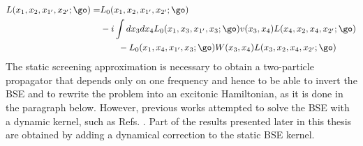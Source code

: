 \begin{align}
\begin{split}
	L(x_1,x_2,x_{1'},x_{2'};\go) = &L_0(x_1,x_2,x_{1'},x_{2'};\go) \\
	    &-i \int dx_3dx_4 L_0(x_1,x_3,x_{1'},x_{3};\go) v(x_3,x_4) L(x_4,x_2,x_{4},x_{2'};\go) \\
		&\qquad - L_0(x_1,x_4,x_{1'},x_{3};\go) W(x_3,x_4)  L(x_3,x_2,x_{4},x_{2'};\go) \label{eq:GW-BSE}
\end{split}
\end{align}
The static screening approximation is necessary to obtain a two-particle propagator that depends only on one frequency and hence to be able to invert the \acrshort{BSE} and to rewrite the problem into an excitonic Hamiltonian, as it is done in the paragraph below. However, previous works attempted to solve the \acrshort{BSE} with a dynamic kernel, such as Refs. \cite{shindo1970effective,adamska2021bethe}. Part of the results presented later in this thesis are obtained by adding a dynamical correction to the static \acrshort{BSE} kernel.

